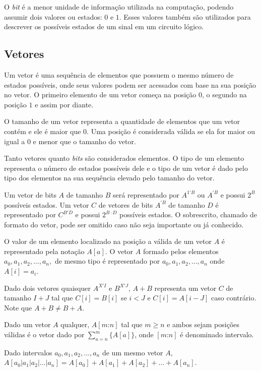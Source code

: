   O \emph{bit} é a menor unidade de informação utilizada na computação, podendo assumir 
  dois valores ou estados: $0$ e $1$. Esses valores também são utilizados para descrever 
  os possíveis estados de um sinal em um circuito lógico.

\subsection{Vetores}
\label{sec:vec}

  Um vetor é uma sequência de elementos que possuem o mesmo número de estados possíveis, 
  onde seus valores podem ser acessados com base na sua posição no vetor. 
  O primeiro elemento de um vetor começa na posição $0$, o segundo na posição $1$
  e assim por diante.

  O tamanho de um vetor representa a quantidade de elementos que um vetor contém e ele 
  é maior que $0$. Uma posição é considerada válida se ela for maior ou igual a $0$ e 
  menor que o tamanho do vetor.

  Tanto vetores quanto \emph{bits} são considerados elementos. O tipo de um elemento 
  representa o número de estados possíveis dele e o tipo de um vetor é dado pelo tipo 
  dos elementos na sua sequência elevado pelo tamanho do vetor.

  Um vetor de bits $A$ de tamanho $B$ será representado por $A^{1'B}$ ou $A^{'B}$ e 
  possui $2^B$ possíveis estados. Um vetor $C$ de vetores de bits $A^{'B}$ de tamanho
  $D$ é representado por $C^{B'D}$ e possui $2^{B \cdot D}$ possíveis estados. 
  O sobrescrito, chamado de formato do vetor, pode ser omitido caso não seja importante
  ou já conhecido.

  O valor de um elemento localizado na posição a válida de um vetor $A$ é representado 
  pela notação $A[a]$. O vetor $A$ formado pelos elementos $a_0, a_1, a_2,..., a_n,$ 
  de mesmo tipo é representado por ${a_0, a_1, a_2,..., a_n}$ onde $A[i] = a_i$.

  Dado dois vetores quaisquer $A^{X'I}$ e $B^{X'J}$, $A + B$ representa um vetor $C$ 
  de tamanho $I + J$ tal que $C[i] = B[i]$ se $i < J$ e $C[i] = A[i-J]$ caso contrário.
  Note que $ A + B \neq B + A $.

  Dado um vetor $A$ qualquer, $A[m\text{:}n]$ tal que $m \geq n$ e ambos sejam posições
  válidas é o vetor dado por $\sum_{a = n}^m{\{A[a]\}}$, onde $[m\text{:}n]$ é denominado 
  intervalo.

  Dado intervalos $a_0, a_1, a_2,..., a_n$ de um mesmo vetor $A$, $A[a_0|a_1|a_2|...|a_n] 
  = A[a_0] + A[a_1] + A[a_2] + … + A[a_n]$.

